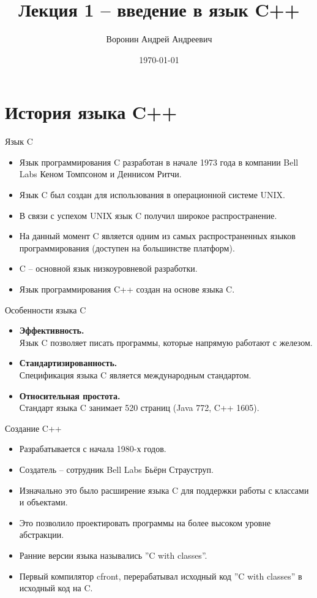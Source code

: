 \documentclass[
    9pt,
    hyperref={pdfencoding=unicode}
    ]{beamer}
\author{Воронин Андрей Андреевич}
\title{Лекция 1 – введение в язык C++}
\institute{Кафедра прикладной математики и информатики}
\date{\today}
\begin{document}
\titlepage 

\section{История языка C++}
\begin{frame}{Язык C}
    \begin{itemize}
        \item Язык программирования C разработан в начале 1973 года в
        компании Bell Labs Кеном Томпсоном и Деннисом Ритчи.
        \item Язык C был создан для использования в операционной
        системе UNIX.
        \item В связи с успехом UNIX язык C получил широкое
        распространение.
        \item На данный момент C является одним из самых
        распространенных языков программирования (доступен на
        большинстве платформ).
        \item C – основной язык низкоуровневой разработки.
        \item Язык программирования C++ создан на основе языка C.
    \end{itemize}
\end{frame}
\begin{frame}{Особенности языка C}
    \begin{itemize}
        \item \textbf{Эффективность.}\\
        Язык C позволяет писать программы, которые напрямую
        работают с железом.
        \item \textbf{Стандартизированность.}\\
        Спецификация языка C является международным
        стандартом.
        \item \textbf{Относительная простота.}\\
        Стандарт языка C занимает 520 страниц (Java 772, C++ 1605).
    \end{itemize}
\end{frame}
\begin{frame}{Создание C++}
    \begin{itemize}
        \item Разрабатывается с начала 1980-х годов.
        \item Создатель – сотрудник Bell Labs Бьёрн Страуструп.
        \item Изначально это было расширение языка C для поддержки
        работы с классами и объектами.
        \item Это позволило проектировать программы на более высоком
        уровне абстракции.
        \item Ранние версии языка назывались ”C with classes”.
        \item Первый компилятор cfront, перерабатывал исходный код ”C
        with classes” в исходный код на C.
    \end{itemize}
\end{frame}
\end{document}
